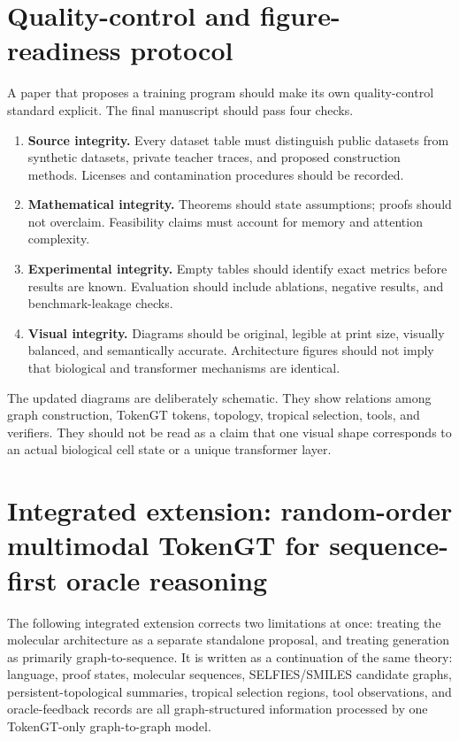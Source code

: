 \documentclass[11pt]{article}
\newcommand{\1}{\mathbf{1}}
\begin{document}
\section{Quality-control and figure-readiness protocol}
\label{sec:qa-protocol}

A paper that proposes a training program should make its own quality-control standard explicit. The final manuscript should pass four checks.

\begin{enumerate}
\item \textbf{Source integrity.} Every dataset table must distinguish public datasets from synthetic datasets, private teacher traces, and proposed construction methods. Licenses and contamination procedures should be recorded.
\item \textbf{Mathematical integrity.} Theorems should state assumptions; proofs should not overclaim. Feasibility claims must account for memory and attention complexity.
\item \textbf{Experimental integrity.} Empty tables should identify exact metrics before results are known. Evaluation should include ablations, negative results, and benchmark-leakage checks.
\item \textbf{Visual integrity.} Diagrams should be original, legible at print size, visually balanced, and semantically accurate. Architecture figures should not imply that biological and transformer mechanisms are identical.
\end{enumerate}

The updated diagrams are deliberately schematic. They show relations among graph construction, TokenGT tokens, topology, tropical selection, tools, and verifiers. They should not be read as a claim that one visual shape corresponds to an actual biological cell state or a unique transformer layer.



\section{Integrated extension: random-order multimodal TokenGT for sequence-first oracle reasoning}
\label{sec:integrated_ugm_extension}

The following integrated extension corrects two limitations at once: treating the molecular architecture as a separate standalone proposal, and treating generation as primarily graph-to-sequence. It is written as a continuation of the same theory: language, proof states, molecular sequences, SELFIES/SMILES candidate graphs, persistent-topological summaries, tropical selection regions, tool observations, and oracle-feedback records are all graph-structured information processed by one TokenGT-only graph-to-graph model.
\end{document}
